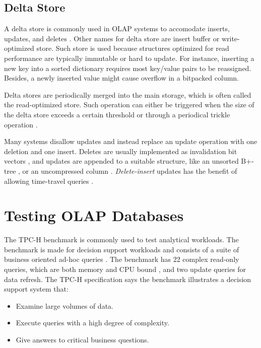 \subsection{Delta Store}
\label{sub:Delta Store}
A delta store is commonly used in OLAP systems to accomodate inserts, updates, and deletes \cite{Raman2013-em, Stonebraker2005-qz}. Other names for delta store are insert buffer or write-optimized store. Such store is used because structures optimized for read performance are typically immutable or hard to update. For instance, inserting a new key into a sorted dictionary requires most key/value pairs to be reassigned. Besides, a newly inserted value might cause overflow in a bitpacked column.

Delta stores are periodically merged into the main storage, which is often called the read-optimized store. Such operation can either be triggered when the size of the delta store exceeds a certain threshold or through a periodical trickle operation \cite{Lahiri2015-mz, Farber2012-vh}.

Many systems disallow updates and instead replace an update operation with one deletion and one insert. Deletes are usually implemented as invalidation bit vectors \cite{Lamb2012-kg, Raman2013-em}, and updates are appended to a suitable structure, like an unsorted B+-tree \cite{Psaroudakis2014-ma}, or an uncompressed column \cite{Farber2012-vh}. \textit{Delete-insert} updates has the benefit of allowing time-travel queries \cite{Plattner2014-fr, Schwalb2014-hn}.

\section{Testing OLAP Databases}
\label{sec:Testing OLAP Databases}
The TPC-H benchmark is commonly used to test analytical workloads. The benchmark is made for decision support workloads and consists of a suite of business oriented ad-hoc queries \cite{Transaction_Processing_Performance_Council_TPC2014-ux}. The benchmark has 22 complex read-only queries, which are both memory and CPU bound \cite{Boncz2005-wj}, and two update queries for data refresh. The TPC-H specification says the benchmark illustrates a decision support system that:
\begin{itemize}
  \item Examine large volumes of data.
  \item Execute queries with a high degree of complexity.
  \item Give answers to critical business questions.
\end{itemize}

